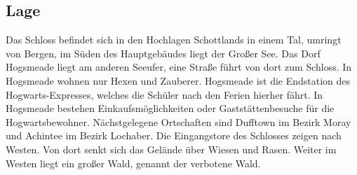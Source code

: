 \documentclass[a4paper, 10pt]{article}
\begin{document}
\subsection*{\Large Lage}
Das Schloss befindet sich in den Hochlagen Schottlands in einem Tal, umringt von Bergen, im Süden des Hauptgebäudes liegt der Großer See. Das Dorf Hogsmeade liegt am anderen Seeufer, eine Straße führt von dort zum Schloss. In Hogsmeade wohnen nur Hexen und Zauberer. Hogsmeade ist die Endstation des Hogwarts-Expresses, welches die Schüler nach den Ferien hierher fährt. In Hogsmeade bestehen Einkaufsmöglichkeiten oder Gaststättenbesuche für die Hogwartsbewohner. Nächstgelegene 
Ortschaften sind Dufftown im Bezirk Moray und Achintee im Bezirk Lochaber. Die Eingangstore des Schlosses zeigen nach Westen. Von dort senkt sich das Gelände über Wiesen und Rasen. Weiter im Westen liegt ein großer Wald, genannt der verbotene Wald.
\end{document}
